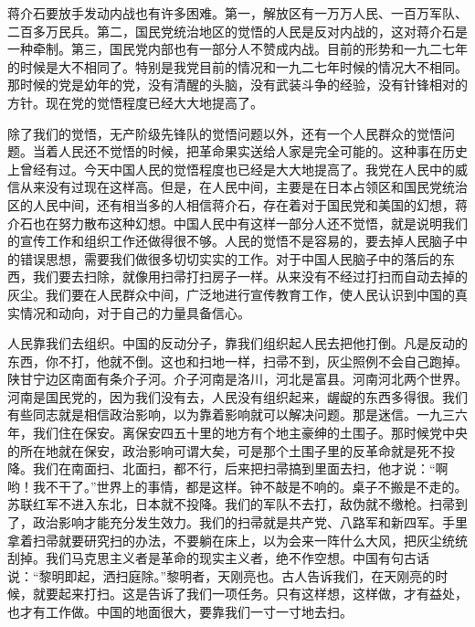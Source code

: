 蒋介石要放手发动内战也有许多困难。第一，解放区有一万万人民、一百万军队、二百多万民兵。第二，国民党统治地区的觉悟的人民是反对内战的，这对蒋介石是一种牵制。第三，国民党内部也有一部分人不赞成内战。目前的形势和一九二七年的时候是大不相同了。特别是我党目前的情况和一九二七年时候的情况大不相同。那时候的党是幼年的党，没有清醒的头脑，没有武装斗争的经验，没有针锋相对的方针。现在党的觉悟程度已经大大地提高了。

除了我们的觉悟，无产阶级先锋队的觉悟问题以外，还有一个人民群众的觉悟问题。当着人民还不觉悟的时候，把革命果实送给人家是完全可能的。这种事在历史上曾经有过。今天中国人民的觉悟程度也已经是大大地提高了。我党在人民中的威信从来没有过现在这样高。但是，在人民中间，主要是在日本占领区和国民党统治区的人民中间，还有相当多的人相信蒋介石，存在着对于国民党和美国的幻想，蒋介石也在努力散布这种幻想。中国人民中有这样一部分人还不觉悟，就是说明我们的宣传工作和组织工作还做得很不够。人民的觉悟不是容易的，要去掉人民脑子中的错误思想，需要我们做很多切切实实的工作。对于中国人民脑子中的落后的东西，我们要去扫除，就像用扫帚打扫房子一样。从来没有不经过打扫而自动去掉的灰尘。我们要在人民群众中间，广泛地进行宣传教育工作，使人民认识到中国的真实情况和动向，对于自己的力量具备信心。

人民靠我们去组织。中国的反动分子，靠我们组织起人民去把他打倒。凡是反动的东西，你不打，他就不倒。这也和扫地一样，扫帚不到，灰尘照例不会自己跑掉。陕甘宁边区南面有条介子河。介子河南是洛川，河北是富县。河南河北两个世界。河南是国民党的，因为我们没有去，人民没有组织起来，龌龊的东西多得很。我们有些同志就是相信政治影响，以为靠着影响就可以解决问题。那是迷信。一九三六年，我们住在保安。离保安四五十里的地方有个地主豪绅的土围子。那时候党中央的所在地就在保安，政治影响可谓大矣，可是那个土围子里的反革命就是死不投降。我们在南面扫、北面扫，都不行，后来把扫帚搞到里面去扫，他才说：“啊哟！我不干了。”世界上的事情，都是这样。钟不敲是不响的。桌子不搬是不走的。苏联红军不进入东北，日本就不投降。我们的军队不去打，敌伪就不缴枪。扫帚到了，政治影响才能充分发生效力。我们的扫帚就是共产党、八路军和新四军。手里拿着扫帚就要研究扫的办法，不要躺在床上，以为会来一阵什么大风，把灰尘统统刮掉。我们马克思主义者是革命的现实主义者，绝不作空想。中国有句古话说：“黎明即起，洒扫庭除。”黎明者，天刚亮也。古人告诉我们，在天刚亮的时候，就要起来打扫。这是告诉了我们一项任务。只有这样想，这样做，才有益处，也才有工作做。中国的地面很大，要靠我们一寸一寸地去扫。

